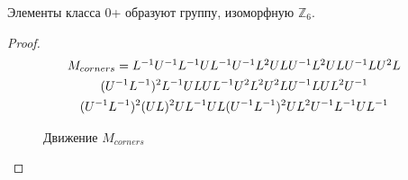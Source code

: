 \documentclass{beamer}
\begin{document}
\begin{frame}
	\begin{theorem}
		Элементы класса 0+ образуют группу, изоморфную $\mathbb{Z}_6$.	
	\end{theorem}
	\begin{proof}
		\vspace*{-7mm}
		\begin{multline*}
		$$
		M_{corners}=L^{-1}U^{-1}L^{-1}UL^{-1}U^{-1}L^2ULU^{-1}L^2ULU^{-1}LU^2L \\
		(U^{-1}L^{-1})^2L^{-1}ULUL^{-1}U^2L^2U^2LU^{-1}LUL^2U^{-1} \\
		(U^{-1}L^{-1})^2(UL)^2UL^{-1}UL(U^{-1}L^{-1})^2UL^2U^{-1}L^{-1}UL^{-1}
		$$
		\end{multline*}
		\RubikCubeSolved
		\vspace*{-1cm}
		\begin{figure}[c]
		\caption{Движение $M_{corners}$}
		\end{figure}
		\vspace*{-7mm}
		\end{proof}
\end{frame}
\end{document}
